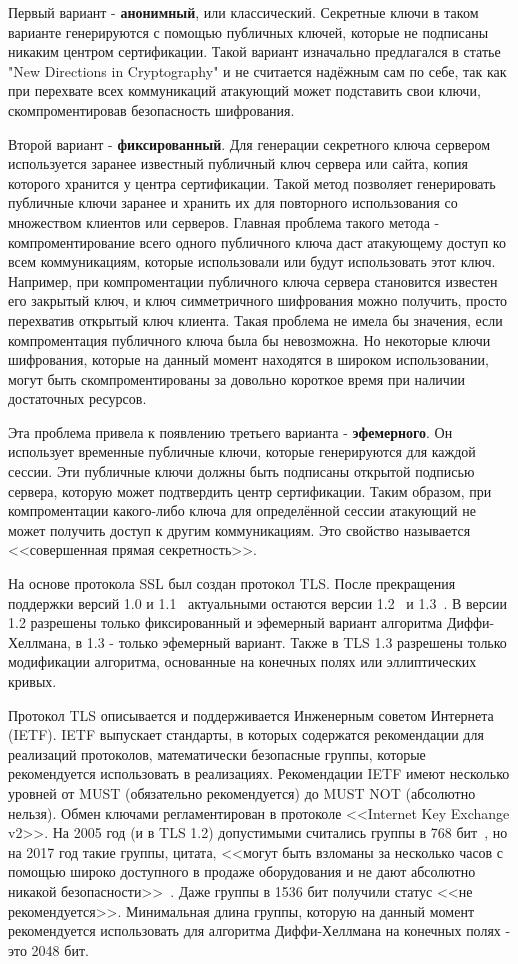 \documentclass[times,specification,annotation]{itmo-student-thesis}
\begin{document}
Первый вариант - \textbf{анонимный}, или классический. Секретные ключи в таком варианте генерируются с помощью публичных
ключей, которые не подписаны никаким центром сертификации.
Такой вариант изначально предлагался в статье "New Directions in Cryptography" и не считается надёжным сам по себе,
так как при перехвате всех коммуникаций атакующий может подставить свои ключи, скомпроментировав безопасность шифрования.

Второй вариант - \textbf{фиксированный}. Для генерации секретного ключа сервером используется заранее известный публичный ключ
сервера или сайта, копия которого хранится у центра сертификации.
Такой метод позволяет генерировать публичные ключи заранее и хранить их для повторного использования со множеством клиентов или серверов.
Главная проблема такого метода - компроментирование всего одного публичного ключа даст атакующему доступ
ко всем коммуникациям, которые использовали или будут использовать этот ключ.
Например, при компроментации публичного ключа сервера становится известен его закрытый ключ, и ключ
симметричного шифрования можно получить, просто перехватив открытый ключ клиента.
Такая проблема не имела бы значения, если компроментация публичного ключа была бы невозможна.
Но некоторые ключи шифрования, которые на данный момент находятся в широком использовании, могут быть скомпроментированы
за довольно короткое время при наличии достаточных ресурсов.

Эта проблема привела к появлению третьего варианта - \textbf{эфемерного}.
Он использует временные публичные ключи, которые генерируются для каждой сессии.
Эти публичные ключи должны быть подписаны открытой подписью сервера, которую может подтвердить
центр сертификации.
Таким образом, при компроментации какого-либо ключа для определённой сессии атакующий не может получить
доступ к другим коммуникациям.
Это свойство называется <<совершенная прямая секретность>>.

На основе протокола SSL был создан протокол TLS.
После прекращения поддержки версий 1.0 и 1.1~\cite{mor20} актуальными остаются версии 1.2~\cite{rfc5246} и 1.3~\cite{rfc8446}.
В версии 1.2 разрешены только фиксированный и эфемерный вариант алгоритма Диффи-Хеллмана, в 1.3 - только эфемерный вариант.
Также в TLS 1.3 разрешены только модификации алгоритма, основанные на конечных полях или эллиптических кривых.

Протокол TLS описывается и поддерживается Инженерным советом Интернета (IETF).
IETF выпускает стандарты, в которых содержатся рекомендации для реализаций протоколов,
математически безопасные группы, которые рекомендуется использовать в реализациях.
Рекомендации IETF имеют несколько уровней от MUST (обязательно рекомендуется) до MUST NOT (абсолютно нельзя).
Обмен ключами регламентирован в протоколе <<Internet Key Exchange v2>>.
На 2005 год (и в TLS 1.2) допустимыми считались группы в 768 бит~\cite{rfc4307}, но на 2017 год
такие группы, цитата, <<могут быть взломаны за несколько часов с помощью широко доступного
в продаже оборудования и не дают абсолютно никакой безопасности>>~\cite{rfc8247}.
Даже группы в 1536 бит получили статус <<не рекомендуется>>.
Минимальная длина группы, которую на данный момент рекомендуется использовать для
алгоритма Диффи-Хеллмана на конечных полях - это 2048 бит.
\end{document}
